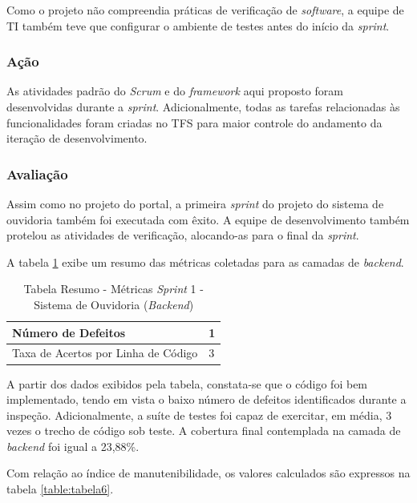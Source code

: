 Como o projeto não compreendia práticas de verificação de \textit{software}, a equipe de TI também teve que configurar o ambiente de testes antes do início da \textit{sprint}.

\subsubsection{Ação}

As atividades padrão do \textit{Scrum} e do \textit{framework} aqui proposto foram desenvolvidas durante a \textit{sprint}. Adicionalmente, todas as tarefas relacionadas às funcionalidades foram criadas no TFS para maior controle do andamento da iteração de desenvolvimento.

\subsubsection{Avaliação}

Assim como no projeto do portal, a primeira \textit{sprint} do projeto do sistema de ouvidoria também foi executada com êxito. A equipe de desenvolvimento também protelou as atividades de verificação, alocando-as para o final da \textit{sprint}.

A tabela \ref{table:tabela5} exibe um resumo das métricas coletadas para as camadas de \textit{backend}.

\begin{table}[h]
\caption{Tabela Resumo - Métricas \textit{Sprint} 1 - Sistema de Ouvidoria (\textit{Backend})}
\centering
\begin{tabular}{ | m{8cm} | m{8cm} | } 
\hline
Número de Defeitos & 1 \\ 
\hline
Taxa de Acertos por Linha de Código & 3 \\ 
\hline
\end{tabular}
\label{table:tabela5}
\end{table}

A partir dos dados exibidos pela tabela, constata-se que o código foi bem implementado, tendo em vista o baixo número de defeitos identificados durante a inspeção. Adicionalmente, a suíte de testes foi capaz de exercitar, em média, 3 vezes o trecho de código sob teste. A cobertura final contemplada na camada de \textit{backend} foi igual a 23,88\%.

Com relação ao índice de manutenibilidade, os valores calculados são expressos na tabela \ref{table:tabela6}.

